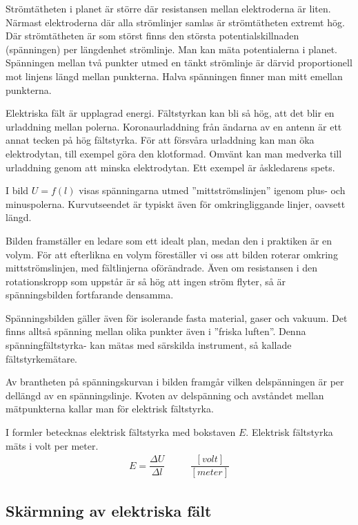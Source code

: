 Strömtätheten i planet är större där resistansen mellan elektroderna är liten.
Närmast elektroderna där alla strömlinjer samlas är strömtätheten extremt hög.
Där strömtätheten är som störst finns den största potentialskillnaden
(spänningen) per längdenhet strömlinje.
Man kan mäta potentialerna i planet.
Spänningen mellan två punkter utmed en tänkt strömlinje är därvid proportionell
mot linjens längd mellan punkterna.
Halva spänningen finner man mitt emellan punkterna.

Elektriska fält är upplagrad energi.
Fältstyrkan kan bli så hög, att det blir en urladdning mellan polerna.
Koronaurladdning från ändarna av en antenn är ett annat tecken på hög
fältstyrka.
För att försvåra urladdning kan man öka elektrodytan, till exempel göra den
klotformad.
Omvänt kan man medverka till urladdning genom att minska elektrodytan.
Ett exempel är åskledarens spets.

I bild  \(U = f(l)\) visas spänningarna utmed
''mittströmslinjen'' igenom plus- och minuspolerna.
Kurvutseendet är typiskt även för omkringliggande linjer, oavsett längd.

Bilden framställer en ledare som ett idealt plan, medan den i praktiken är en
volym.
För att efterlikna en volym föreställer vi oss att bilden roterar omkring
mittströmslinjen, med fältlinjerna oförändrade.
Även om resistansen i den rotationskropp som uppstår är så hög att ingen ström
flyter, så är spänningsbilden fortfarande densamma.

Spänningsbilden gäller även för isolerande fasta material, gaser och vakuum.
Det finns alltså spänning mellan olika punkter även i ''friska luften''.
Denna spänningfältstyrka- kan mätas med särskilda instrument, så kallade
fältstyrkemätare.

\newpage
Av brantheten på spänningskurvan i bilden framgår vilken delspänningen är per
dellängd av en spänningslinje.
Kvoten av delspänning och avståndet mellan mätpunkterna kallar man för
elektrisk fältstyrka.

I formler betecknas elektrisk fältstyrka med bokstaven \(E\).
Elektrisk fältstyrka mäts i volt per meter.
\[
\begin{array}{ccc}
E=\dfrac{\Delta U}{\Delta l} &\quad& \dfrac{[volt]}{[meter]}
\end{array}
\]
\subsection{Skärmning av elektriska fält}
\label{elektrostatik skärmning}

